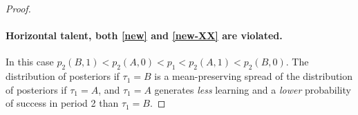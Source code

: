 \documentclass[12pt,american]{paper}
\theoremstyle{remark}
\begin{document}
\begin{proof}

%
%




\paragraph{Horizontal talent, both \eqref{new} and \eqref{new-XX} are violated.} In this case $p_2(B,1)<p_2(A,0)<p_1<p_2(A,1)<p_2(B,0)$. The distribution of posteriors if $\tau_1=B$ is a mean-preserving spread of the distribution of posteriors if $\tau_1=A$, and $\tau_1=A$ generates \textit{less} learning and a \textit{lower} probability of success in period 2 than $\tau_1=B$.


\end{proof}
\end{document}
